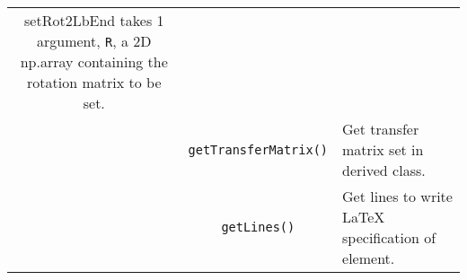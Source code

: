 \begin{sidewaystable}[h]
\begin{center}
\begin{tabular}{|c|c|p{10cm}|}
                                                               setRot2LbEnd takes 1 argument, \texttt{R}, a 2D np.array containing
                                                               the rotation matrix to be set.                                    \\
                                & \texttt{getTransferMatrix()}  & Get transfer matrix set in derived class.                         \\
                                & \texttt{getLines()}        & Get lines to write LaTeX specification of element.                   \\
      \hline
    \end{tabular}
  \end{center}
\end{sidewaystable}

